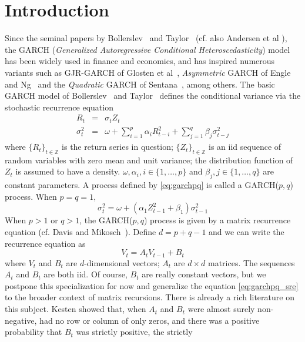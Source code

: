 \documentclass[aoas,preprint]{imsart}
\numberwithin{equation}{section}
\theoremstyle{plain}
\begin{document}
\section{Introduction}
Since the seminal papers by Bollerslev~\cite{bollerslev:1986} and 
Taylor~\cite{taylor:2008} (cf. also Andersen et al
\cite{andersen:davis:kreiss:mikosch:2009}), the GARCH 
({\em Generalized Autoregressive Conditional Heteroscedasticity}) model
has been widely used in finance and economics, and has
inspired numerous variants such as GJR-GARCH of Glosten et
al~\cite{glosten:1993}, {\em Asymmetric} GARCH of Engle and
Ng~\cite{engle:Ng:1993} and the {\em Quadratic} GARCH of
Sentana~\cite{sentana:1995}, among others. The basic GARCH model of
Bollerslev~\cite{bollerslev:1986} and Taylor~\cite{taylor:2008}
defines the conditional variance via the stochastic recurrence
equation
\begin{eqnarray}
  R_t &=& \sigma_t Z_t \nonumber \\
  \sigma_{t}^2 &=& \omega + \sum_{i=1}^p \alpha_i R_{t-i}^2 +
  \sum_{j=1}^q \beta_j \sigma_{t-j}^2   \label{eq:garchpq}
\end{eqnarray}
where $\{R_t\}_{t \in \mathbb Z}$ is the return series in question;
$\{Z_t\}_{t \in \mathbb Z}$ is an iid sequence of random variables
with zero mean and unit variance; the distribution function of $Z_t$
is assumed to have a density.
$\omega, \alpha_i, i \in \{1,\dots,p\}$ and
$\beta_j, j \in \{1,\dots,q\}$ are constant parameters. A process
defined by \eqref{eq:garchpq} is called a GARCH($p,q$) process.
When $p = q = 1$,
\[
\sigma_t^2 = \omega + (\alpha_1 Z_{t-1}^2 + \beta_1) \sigma_{t-1}^2
\]
When $p > 1$ or $q > 1$, the GARCH($p, q$) process is given by
a matrix recurrence equation (cf. Davis and
Mikosch~\cite{davis:mikosch:2001}).
Define $d = p + q - 1$ and we can write the recurrence equation as
\begin{equation}
  \label{eq:garchpq_sre}
  V_t = A_t V_{t-1} + B_t
\end{equation}
where $V_t$ and $B_t$ are $d$-dimensional vectors; $A_t$ are
$d \times d$ matrices. The sequences $A_t$ and $B_t$ are both iid.
Of course, $B_t$ are really constant vectors,
but we postpone this specialization for now and generalize the
equation \eqref{eq:garchpq_sre} to the broader context of matrix
recursions.
There is already a rich literature on this subject. Kesten
\cite{kesten:1973} showed that, when $A_t$ and $B_t$ were almost
surely non-negative, had no row or column of only zeros, and there was
a positive probability that $B_t$ was strictly positive, the strictly
\end{document}
